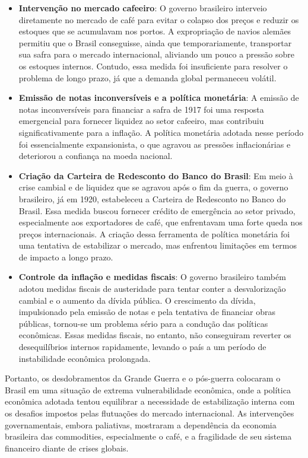 \documentclass[a4paper,12pt]{article}[abntex2]
\begin{document}
\begin{itemize}
    \item \textbf{Intervenção no mercado cafeeiro}: O governo brasileiro interveio diretamente no mercado de café para evitar o colapso dos preços e reduzir os estoques que se acumulavam nos portos. A expropriação de navios alemães permitiu que o Brasil conseguisse, ainda que temporariamente, transportar sua safra para o mercado internacional, aliviando um pouco a pressão sobre os estoques internos. Contudo, essa medida foi insuficiente para resolver o problema de longo prazo, já que a demanda global permaneceu volátil.
    
    \item \textbf{Emissão de notas inconversíveis e a política monetária}: A emissão de notas inconversíveis para financiar a safra de 1917 foi uma resposta emergencial para fornecer liquidez ao setor cafeeiro, mas contribuiu significativamente para a inflação. A política monetária adotada nesse período foi essencialmente expansionista, o que agravou as pressões inflacionárias e deteriorou a confiança na moeda nacional.
    
    \item \textbf{Criação da Carteira de Redesconto do Banco do Brasil}: Em meio à crise cambial e de liquidez que se agravou após o fim da guerra, o governo brasileiro, já em 1920, estabeleceu a Carteira de Redesconto no Banco do Brasil. Essa medida buscou fornecer crédito de emergência ao setor privado, especialmente aos exportadores de café, que enfrentavam uma forte queda nos preços internacionais. A criação dessa ferramenta de política monetária foi uma tentativa de estabilizar o mercado, mas enfrentou limitações em termos de impacto a longo prazo.
    
    \item \textbf{Controle da inflação e medidas fiscais}: O governo brasileiro também adotou medidas fiscais de austeridade para tentar conter a desvalorização cambial e o aumento da dívida pública. O crescimento da dívida, impulsionado pela emissão de notas e pela tentativa de financiar obras públicas, tornou-se um problema sério para a condução das políticas econômicas. Essas medidas fiscais, no entanto, não conseguiram reverter os desequilíbrios internos rapidamente, levando o país a um período de instabilidade econômica prolongada.
\end{itemize}

Portanto, os desdobramentos da Grande Guerra e o pós-guerra colocaram o Brasil em uma situação de extrema vulnerabilidade econômica, onde a política econômica adotada tentou equilibrar a necessidade de estabilização interna com os desafios impostos pelas flutuações do mercado internacional. As intervenções governamentais, embora paliativas, mostraram a dependência da economia brasileira das commodities, especialmente o café, e a fragilidade de seu sistema financeiro diante de crises globais.
\end{document}
